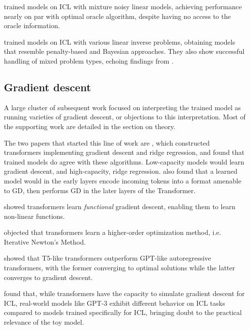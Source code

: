 \documentclass[12pt]{article}
\begin{document}
\cite{pathakTransformersCanOptimally2023} trained models on ICL with mixture noisy linear models, achieving performance nearly on par with optimal oracle algorithm, despite having no access to the oracle information.

\cite{ahujaTransformersCanLearn2023} trained models on ICL with various linear inverse problems, obtaining models that resemble penalty-based and Bayesian approaches. They also show successful handling of mixed problem types, echoing findings from \cite{yadlowskyPretrainingDataMixtures2023}.

\subsection{Gradient descent}

A large cluster of subsequent work focused on interpreting the trained model as running varieties of gradient descent, or objections to this interpretation. Most of the supporting work are detailed in the section on theory.

The two papers that started this line of work are \cite{akyurekWhatLearningAlgorithm2023, vonoswaldTransformersLearnIncontext2023}, which constructed transformers implementing gradient descent and ridge regression, and found that trained models do agree with these algorithms. Low-capacity models would learn gradient descent, and high-capacity, ridge regression. \cite{vonoswaldTransformersLearnIncontext2023} also found that a learned model would in the early layers encode incoming tokens into a format amenable to GD, then performs GD in the later layers of the Transformer.

\cite{chengTransformersImplementFunctional2024} showed transformers learn \textit{functional} gradient descent, enabling them to learn non-linear functions.

\cite{fuTransformersLearnHigherOrder2023} objected that transformers learn a higher-order optimization method, i.e. Iterative Newton's Method.

\cite{dingCausalLMNotOptimal2024} showed that T5-like transformers outperform GPT-like autoregressive transformers, with the former converging to optimal solutions while the latter converges to gradient descent.

\cite{shenRevisitingHypothesisPretrained2024} found that, while transformers have the capacity to simulate gradient descent for ICL, real-world models like GPT-3 exhibit different behavior on ICL tasks compared to models trained specifically for ICL, bringing doubt to the practical relevance of the toy model.
\end{document}
